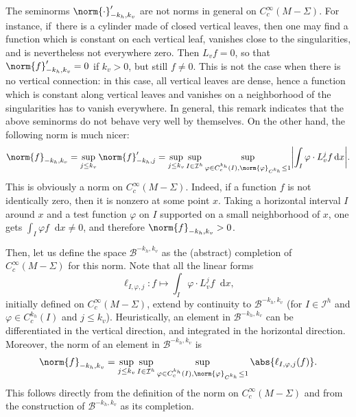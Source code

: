 \documentclass[10pt]{amsart}
\newcommand{\boI}{\mathcal{I}}
\newcommand{\boB}{\mathcal{B}}
\newcommand{\dd}{\mathop{}\!\mathrm{d}}
\newcommand{\absgg}[1]{\biggl \lvert#1\biggr\rvert}
\let\phi\varphi
\theoremstyle{definition}
\numberwithin{equation}{section}
\begin{document}
The seminorms $\norm{\cdot}'_{-k_h, k_v}$ are not norms in general on
$C^\infty_c(M-\Sigma)$. For instance, if~there is a cylinder made of closed
vertical leaves, then one may find a function which is constant on each
vertical leaf, vanishes close to the singularities, and is nevertheless not
everywhere zero. Then $L_v f= 0$, so that $\norm{f}'_{-k_h, k_v}=0$ if
$k_v>0$, but still $f \neq 0$. This is not the case when there is no vertical
connection: in this case, all vertical leaves are dense, hence a function
which is constant along vertical leaves and vanishes on a neighborhood of the
singularities has to vanish everywhere. In general, this remark indicates
that the above seminorms do not behave very well by themselves. On the other
hand, the following norm is much nicer:
\begin{equation}
\label{eq:define_norm}
\norm{f}_{-k_h, k_v} = \sup_{j\leq k_v} \norm{f}'_{-k_h, j}
= \sup_{j\leq k_v} \sup_{I \in \boI^h} \sup_{\phi \in C^{k_h}_c(I),
\norm{\phi}_{C^{k_h}} \leq 1} \absgg{\int_I \phi \cdot L_v^j f \dd x}.
\end{equation}
This is obviously a norm on $C^\infty_c(M-\Sigma)$. Indeed, if a function $f$
is not identically zero, then it is nonzero at some point $x$. Taking a
horizontal interval $I$ around $x$ and a test function $\phi$ on $I$
supported on a small neighborhood of $x$, one gets $\int_I \phi f \dd x \neq
0$, and therefore $\norm{f}_{-k_h, k_v}>0$.

Then, let us define the space $\boB^{-k_h, k_v}$ as the (abstract) completion
of $C^\infty_c(M-\Sigma)$ for this norm. Note that all the linear forms
\[
\ell_{I, \phi,j} : f \mapsto \int_I \phi \cdot L_v^j f \dd x,
\]
initially
defined on $C^\infty_c(M-\Sigma)$, extend by continuity to $\boB^{-k_h, k_v}$
(for $I \in \boI^h$ and $\phi \in C^{k_h}_c(I)$ and $j \leq k_v$).
Heuristically, an element in $\boB^{-k_h, k_v}$ can be differentiated in the
vertical direction, and integrated in the horizontal direction. Moreover, the
norm of an element in $\boB^{-k_h, k_v}$ is
\begin{equation}
\label{eq:norme_completion}
\norm{f}_{-k_h, k_v}
= \sup_{j\leq k_v} \sup_{I \in \boI^h} \sup_{\phi \in C^{k_h}_c(I),
\norm{\phi}_{C^{k_h}} \leq 1} \abs{\ell_{I,\phi, j}(f)}.
\end{equation}
This follows directly from the definition of the norm on
$C^\infty_c(M-\Sigma)$ and from the construction of $\boB^{-k_h, k_v}$ as its
completion.
\end{document}
